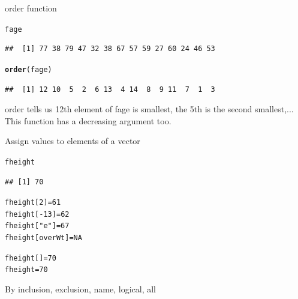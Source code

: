 \documentclass{beamer}\usepackage[]{graphicx}\usepackage[]{color}
\makeatletter
\newcommand{\hlnum}[1]{\textcolor[rgb]{0.686,0.059,0.569}{#1}}%
\newcommand{\hlstr}[1]{\textcolor[rgb]{0.192,0.494,0.8}{#1}}%
\newcommand{\hlopt}[1]{\textcolor[rgb]{0,0,0}{#1}}%
\newcommand{\hlstd}[1]{\textcolor[rgb]{0.345,0.345,0.345}{#1}}%
\newcommand{\hlkwb}[1]{\textcolor[rgb]{0.69,0.353,0.396}{#1}}%
\newcommand{\hlkwd}[1]{\textcolor[rgb]{0.737,0.353,0.396}{\textbf{#1}}}%
\newenvironment{kframe}{%
 \def\at@end@of@kframe{}%
 \ifinner\ifhmode%
  \def\at@end@of@kframe{\end{minipage}}%
  \begin{minipage}{\columnwidth}%
 \fi\fi%
 \def\FrameCommand##1{\hskip\@totalleftmargin \hskip-\fboxsep
 \colorbox{shadecolor}{##1}\hskip-\fboxsep
     \hskip-\linewidth \hskip-\@totalleftmargin \hskip\columnwidth}%
 \MakeFramed {\advance\hsize-\width
   \@totalleftmargin\z@ \linewidth\hsize
   \@setminipage}}%
 {\par\unskip\endMakeFramed%
 \at@end@of@kframe}
\newenvironment{knitrout}{}{} %
\renewenvironment{knitrout}{\begin{singlespace}}{\end{singlespace}}
\theoremstyle{mystyle}
\makeatother
\begin{document}
\begin{frame}[fragile]{order function}%
\begin{knitrout}
\color{fgcolor}\begin{kframe}
\begin{alltt}
\hlstd{fage}
\end{alltt}
\begin{verbatim}
##  [1] 77 38 79 47 32 38 67 57 59 27 60 24 46 53
\end{verbatim}
\begin{alltt}
\hlkwd{order}\hlstd{(fage)}
\end{alltt}
\begin{verbatim}
##  [1] 12 10  5  2  6 13  4 14  8  9 11  7  1  3
\end{verbatim}
\end{kframe}
\end{knitrout}
order tells us 12th element of fage is smallest, the 5th is the second smallest,...
This function has a decreasing argument too. 
\end{frame}

\begin{frame}[fragile]{Assign values to elements of a vector}
\begin{knitrout}
\color{fgcolor}\begin{kframe}
\begin{alltt}
\hlstd{fheight}
\end{alltt}
\begin{verbatim}
## [1] 70
\end{verbatim}
\begin{alltt}
\hlstd{fheight[}\hlnum{2}\hlstd{]} \hlkwb{=} \hlnum{61}
\hlstd{fheight[}\hlopt{-}\hlnum{13}\hlstd{]} \hlkwb{=} \hlnum{62}
\hlstd{fheight[}\hlstr{"e"}\hlstd{]} \hlkwb{=} \hlnum{67}
\hlstd{fheight[overWt]} \hlkwb{=} \hlnum{NA}
\end{alltt}


{\ttfamily\noindent\bfseries\color{errorcolor}{\#\# Error in fheight[overWt] = NA: object 'overWt' not found}}\begin{alltt}
\hlstd{fheight[]} \hlkwb{=} \hlnum{70}
\hlstd{fheight} \hlkwb{=} \hlnum{70}
\end{alltt}
\end{kframe}
\end{knitrout}
By inclusion, exclusion, name, logical, all
\end{frame}
\end{document}
